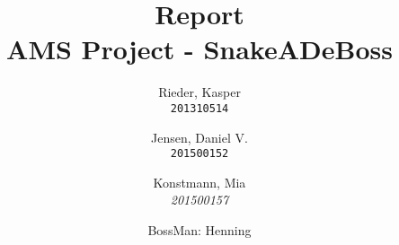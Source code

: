 \documentclass{article}
\author{
  Rieder, Kasper\\
  \texttt{201310514}
  \and
  Jensen, Daniel V.\\
  \texttt{201500152}
  \and
  Konstmann, Mia \\
  \textit{201500157}
  \and
  BossMan: Henning \\
}
\date{}
\begin{document}
\title{Report \\ AMS Project - SnakeADeBoss\\}

\maketitle
\newpage
\tableofcontents



\newpage


\end{document}
